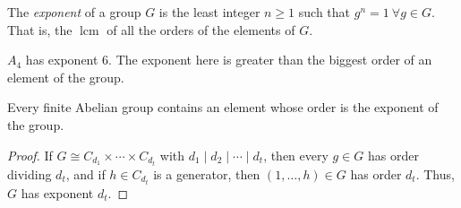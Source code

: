 \begin{definition}{}{}
    The \textit{exponent} of a group \(G\) is the least integer \(n \geq 1\) such that \(g^n = 1 ~ \forall g\in G\). That is, the \(\operatorname{lcm}\) of all the orders of the elements of \(G\).
\end{definition}
\begin{example}
    \(A_4\) has exponent 6. The exponent here is greater than the biggest order of an element of the group.
\end{example}
\begin{corollary}{}{}
    Every finite Abelian group contains an element whose order is the exponent of the group.
\end{corollary}
\begin{proof}
    If \(G \cong C_{d_1} \times \cdots \times C_{d_t}\) with \(d_1 \mid d_2 \mid \cdots \mid d_t\), then every \(g \in G\) has order dividing \(d_t\), and if \(h \in C_{d_t}\) is a generator, then \((1, \ldots, h)\in G\) has order \(d_t\). Thus, \(G\) has exponent \(d_t\).
\end{proof}